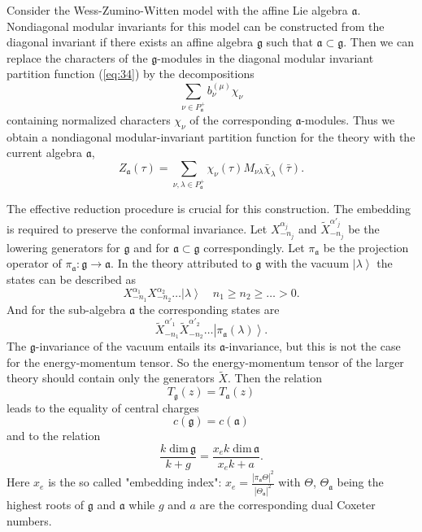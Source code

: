 \documentclass[12pt]{iopart}
\theoremstyle{definition}
\newcommand{\af}{\mathfrak{a}}
\begin{document}
Consider the Wess-Zumino-Witten model with the affine Lie algebra $\af$.
Nondiagonal modular invariants for this model can be constructed from the diagonal
invariant if there exists an affine algebra $\mathfrak{g}$ such that $\af\subset\mathfrak{g}$.
Then we can replace the characters of the $\mathfrak{g}$-modules in the diagonal
modular invariant partition function (\ref{eq:34})
by the decompositions
\begin{equation*}
  \label{eq:32}
\sum_{\nu \in P^{+}_{\af}}b^{(\mu)}_{\nu} \chi_{\nu}
\end{equation*}
containing normalized characters $\chi_{\nu}$ of the corresponding $\af$-modules.
Thus we obtain a nondiagonal modular-invariant  partition function for the theory with
the current algebra $\af$,
\begin{equation}
  \label{eq:36}
   Z_{\af}(\tau)=\sum_{ \nu,\lambda\in P^{+}_{\af}} \chi_{\nu}(\tau)M_{\nu\lambda}\bar \chi_{\lambda}(\bar \tau).
\end{equation}

The effective reduction procedure is crucial for this construction.
The embedding is required to preserve the conformal invariance.
Let $X^{\alpha_j}_{-n_j}$ and $\tilde{X}^{\alpha'_j}_{-n_j}$ be the lowering generators for
$\mathfrak{g}$ and for $\af\subset\mathfrak{g}$ correspondingly.
Let $\pi_{\af}$ be the projection operator of
$\pi_{\af}:\mathfrak{g}\longrightarrow \af$.
In the theory attributed to $\mathfrak{g}$ with the vacuum $\left|\lambda\right>$
the states can be described as
\begin{equation*}
  \label{eq:109}
  X^{\alpha_1}_{-n_1}X^{\alpha_2}_{-n_2}\dots\left|\lambda\right>\quad n_1\geq n_2\geq \dots>0.
\end{equation*}
And for the sub-algebra $\af$ the corresponding states are
\begin{equation*}
  \label{eq:110}
  \tilde{X}^{\alpha'_1}_{-n_1}\tilde{X}^{\alpha'_2}_{-n_2}\dots\left|\pi_{\af}(\lambda)\right>.
\end{equation*}
The $\mathfrak{g}$-invariance of the vacuum entails its $\af$-invariance,
but this is not the case for the energy-momentum tensor. So the energy-momentum tensor of the larger theory
should contain only the generators $\tilde{X}$. Then the relation
\begin{equation}
  \label{eq:2}
  T_{\mathfrak{g}}(z)=T_{\af}(z)
\end{equation}
leads to the equality of central charges
\begin{equation*}
  \label{eq:33}
  c(\mathfrak{g})=c(\af)
\end{equation*}
and to the relation
\begin{equation}
  \label{eq:111}
  \frac{k\;\mathrm{dim}\,\mathfrak{g}}{k+g}=\frac{x_e k\; \mathrm{dim}\,\af}{x_ek+a}.
\end{equation}
Here $x_e$ is the so called "embedding index":
$x_e=\frac{\left|\pi_{\mathfrak{a}} \Theta\right|^2}{\left|\Theta_{\mathfrak{a}}\right|^2}$
with $\Theta$, $\Theta_{\mathfrak{a}}$ being the highest roots of
$\mathfrak{g}$ and $\mathfrak{a}$
while $g$  and $a$ are the  corresponding dual Coxeter numbers.
\end{document}
